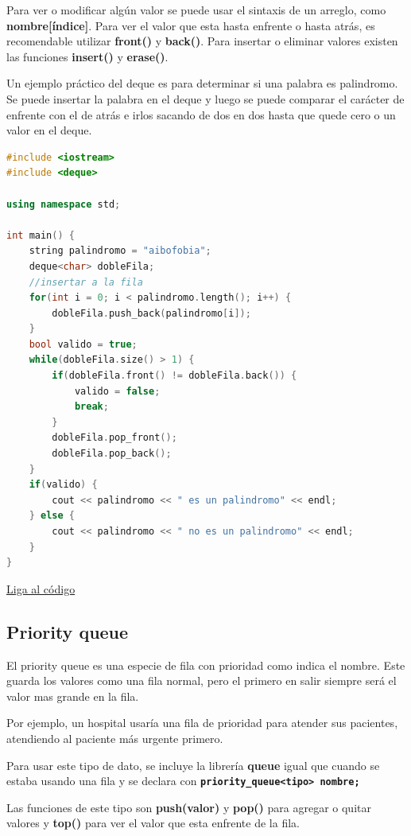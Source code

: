 \documentclass{article}
\begin{document}
Para ver o modificar algún valor se puede usar el sintaxis de un arreglo, como \textbf{nombre[índice]}. Para ver el valor que esta hasta enfrente o hasta atrás, es recomendable utilizar \textbf{front()} y \textbf{back()}. Para insertar o eliminar valores existen las funciones \textbf{insert()} y \textbf{erase()}.

Un ejemplo práctico del deque es para determinar si una palabra es palindromo. Se puede insertar la palabra en el deque y luego se puede comparar el carácter de enfrente con el de atrás e irlos sacando de dos en dos hasta que quede cero o un valor en el deque.

\begin{lstlisting}[language=C++, caption=Deques]
#include <iostream>
#include <deque>

using namespace std;

int main() {
    string palindromo = "aibofobia";
    deque<char> dobleFila;
    //insertar a la fila
    for(int i = 0; i < palindromo.length(); i++) {
        dobleFila.push_back(palindromo[i]);
    }
    bool valido = true;
    while(dobleFila.size() > 1) {
        if(dobleFila.front() != dobleFila.back()) {
            valido = false;
            break;
        }
        dobleFila.pop_front();
        dobleFila.pop_back();
    }
    if(valido) {
        cout << palindromo << " es un palindromo" << endl;
    } else {
        cout << palindromo << " no es un palindromo" << endl;
    }
}
\end{lstlisting}
\href{https://repl.it/@Jamesscn/Deque}{Liga al código}

\subsection{Priority queue}

El priority queue es una especie de fila con prioridad como indica el nombre. Este guarda los valores como una fila normal, pero el primero en salir siempre será el valor mas grande en la fila.

Por ejemplo, un hospital usaría una fila de prioridad para atender sus pacientes, atendiendo al paciente más urgente primero.

Para usar este tipo de dato, se incluye la librería \textbf{queue} igual que cuando se estaba usando una fila y se declara con \textbf{\lstinline{priority_queue<tipo> nombre;}}

Las funciones de este tipo son \textbf{push(valor)} y \textbf{pop()} para agregar o quitar valores y \textbf{top()} para ver el valor que esta enfrente de la fila.
\end{document}
